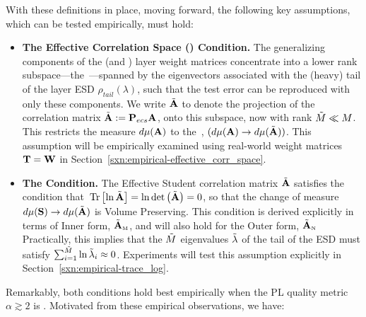 With these definitions in place, moving forward, the following key assumptions, which can be tested empirically, must hold:
\begin{itemize}
  \item
  \textbf{The Effective Correlation Space (\ECS) Condition.}
  The generalizing components of the \Student (and \Teacher) layer weight matrices concentrate into a lower rank subspace---the~\ECS---spanned by the
  eigenvectors associated with the (heavy) tail of the layer ESD $\rho_{tail}(\lambda)$, such that the test error can 
  be reproduced with only these components. 
  We write $\tilde{\mathbf{A}}$ to denote the projection of the correlation
  matrix $\tilde{\mathbf{A}}:=\mathbf{P}_{ecs}\mathbf{A}$, onto this subspace, now with rank $\tilde{M}\ll M$.
  This restricts the measure $d\mu(\mathbf{A})$ to the~\ECS, $(d\mu(\mathbf{A})\rightarrow d\mu(\tilde{\mathbf{A}}))$.
  This assumption will be empirically examined using real-world \Teacher weight matrices ${\mathbf{T}}={\mathbf{W}}$
  in Section~\ref{sxn:empirical-effective_corr_space}. 
  \item
  \textbf{The \TRACELOG Condition.}
  The Effective Student correlation matrix $\tilde{\mathbf{A}}$ 
  satisfies the \ERG condition that $\mbox{}\operatorname{Tr}\left[\ln\tilde{\mathbf{A}}\right]=\ln\mbox{}{\text{det}}\left(\tilde{\mathbf{A}}\right)=0$,
  so that the change of measure $d\mu({\mathbf{S}}) \rightarrow d\mu(\tilde{\mathbf{A}}) $ is Volume Preserving.
  This condition is derived explicitly in terms of Inner form,  $\tilde{\mathbf{A}}_{\text{\tiny M}}$, and will also  hold for the Outer form, $\tilde{\mathbf{A}}_{\text{\tiny N}}$
  Practically, this implies that the $\tilde{M}$ eigenvalues $\tilde{\lambda}$
  of the tail of the ESD must satisfy $\sum_{i=1}^{\tilde{M}}\ln\tilde{\lambda}_{i}\approx 0$.
  Experiments will test this assumption explicitly in Section~\ref{sxn:empirical-trace_log}.
\end{itemize}
Remarkably, both conditions hold best empirically when the \HTSR PL quality metric $\alpha\gtrsim 2$ is \Ideal. Motivated from these empirical observations, we have:
